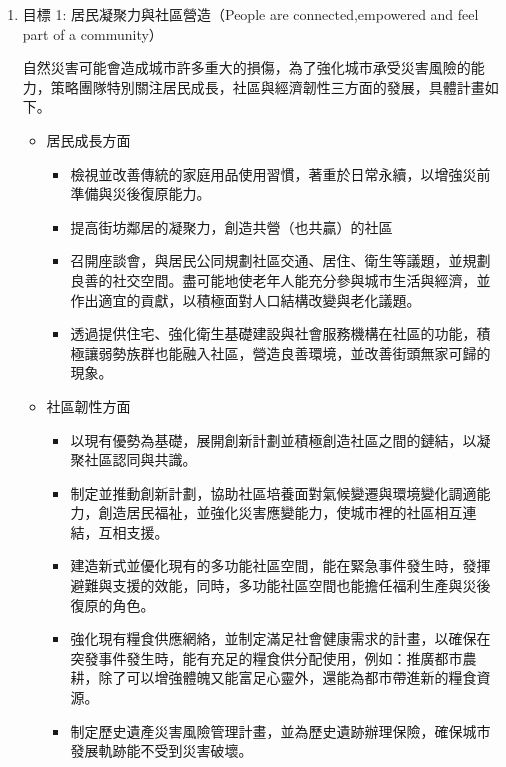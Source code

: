\documentclass[a4paper,12pt]{article}
\begin{document}
\begin{enumerate}
\begin{enumerate}
\begin{enumerate}
\item 目標 1: 居民凝聚力與社區營造（People are connected,empowered and feel part of a community）
\label{sec:org55e6f5e}

自然災害可能會造成城市許多重大的損傷，為了強化城市承受災害風險的能力，策略團隊特別關注居民成長，社區與經濟韌性三方面的發展，具體計畫如下。\\
\begin{itemize}
\item 居民成長方面
\label{sec:org55c6a58}
\begin{itemize}
\item 檢視並改善傳統的家庭用品使用習慣，著重於日常永續，以增強災前準備與災後復原能力。\\
\item 提高街坊鄰居的凝聚力，創造共營（也共贏）的社區\\
\item 召開座談會，與居民公同規劃社區交通、居住、衛生等議題，並規劃良善的社交空間。盡可能地使老年人能充分參與城市生活與經濟，並作出適宜的貢獻，以積極面對人口結構改變與老化議題。\\
\item 透過提供住宅、強化衛生基礎建設與社會服務機構在社區的功能，積極讓弱勢族群也能融入社區，營造良善環境，並改善街頭無家可歸的現象。\\
\end{itemize}
\item 社區韌性方面
\label{sec:orga53f378}
\begin{itemize}
\item 以現有優勢為基礎，展開創新計劃並積極創造社區之間的鏈結，以凝聚社區認同與共識。\\
\item 制定並推動創新計劃，協助社區培養面對氣候變遷與環境變化調適能力，創造居民福祉，並強化災害應變能力，使城市裡的社區相互連結，互相支援。\\
\item 建造新式並優化現有的多功能社區空間，能在緊急事件發生時，發揮避難與支援的效能，同時，多功能社區空間也能擔任福利生產與災後復原的角色。\\
\item 強化現有糧食供應網絡，並制定滿足社會健康需求的計畫，以確保在突發事件發生時，能有充足的糧食供分配使用，例如：推廣都市農耕，除了可以增強體魄又能富足心靈外，還能為都市帶進新的糧食資源。\\
\item 制定歷史遺產災害風險管理計畫，並為歷史遺跡辦理保險，確保城市發展軌跡能不受到災害破壞。\\

\end{itemize}
\end{itemize}
\end{enumerate}
\end{enumerate}
\end{enumerate}
\end{document}

